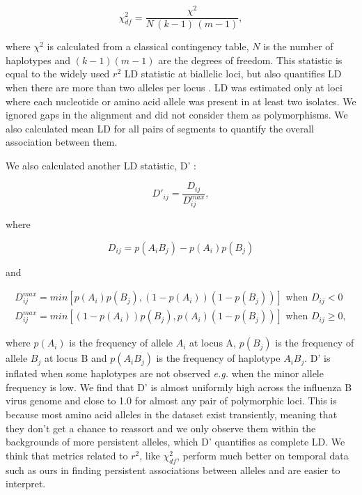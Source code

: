 \documentclass[11pt,oneside,letterpaper]{article}
\newcommand{\chiSq}{\chi^{2}_{df}}
\begin{document}
\begin{equation}
\chiSq=\frac{\chi^{2}}{N\,(k-1)\,(m-1)},
\end{equation}

where $\chi^{2}$ is calculated from a classical contingency table, $N$ is the number of haplotypes and $(k-1)(m-1)$ are the degrees of freedom.
This statistic is equal to the widely used $r^2$ LD statistic at biallelic loci, but also quantifies LD when there are more than two alleles per locus \citep{zhao2005}.
LD was estimated only at loci where each nucleotide or amino acid allele was present in at least two isolates.
We ignored gaps in the alignment and did not consider them as polymorphisms.
We also calculated mean LD for all pairs of segments to quantify the overall association between them.

We also calculated another LD statistic, D' \citep{lewontin1964}:

\begin{equation}
D'_{ij}=\frac{D_{ij}}{D_{ij}^{max}},
\end{equation}

where

\begin{equation}
D_{ij}=p(A_i B_j) - p(A_i) p(B_j)
\end{equation}

and

\begin{equation}
\begin{split}
D_{ij}^{max}=min[ p(A_i) p(B_j) , (1-p(A_i))(1-p(B_j)) ] \mbox{ when } D_{ij} < 0\\
D_{ij}^{max}=min[ (1-p(A_i)) p(B_j) , p(A_i)(1-p(B_j)) ] \mbox{ when } D_{ij} \geq 0,
\end{split}
\end{equation}

where $p(A_i)$ is the frequency of allele $A_i$ at locus A, $p(B_j)$ is the frequency of allele $B_j$ at locus B and $p(A_i B_j)$ is the frequency of haplotype $A_i B_j$.
D' is inflated when some haplotypes are not observed \textit{e.g.} when the minor allele frequency is low.
We find that D' is almost uniformly high across the influenza B virus genome and close to 1.0 for almost any pair of polymorphic loci.
This is because most amino acid alleles in the dataset exist transiently, meaning that they don't get a chance to reassort and we only observe them within the backgrounds of more persistent alleles, which D' quantifies as complete LD.
We think that metrics related to $r^2$, like $\chiSq$, perform much better on temporal data such as ours in finding persistent associations between alleles and are easier to interpret.
\end{document}
